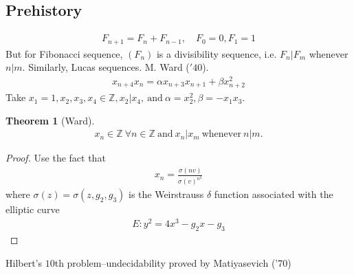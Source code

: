 \documentclass[12pt,reqno]{amsart}
\numberwithin{equation}{section}  %
\newcommand{\zz}{\mathbb{Z}}
\newtheorem{theorem}{Theorem}[section]
\begin{document}
  \subsection{Prehistory} 
  \label{ssec:prehistory}
%
%
  \begin{equation*}
    \begin{split}
      F_{n+1} = F_{n} + F_{n-1}, \quad F_{0}=0, F_{1}=1
    \end{split}
  \end{equation*}
%
%
  But for Fibonacci sequence, $(F_{n})$ is a divisibility sequence, i.e.
  $F_{n} \vert F_{m}$ whenever $n \vert m$. Similarly, Lucas sequences.
  M. Ward ($'40$).
%
%
  \begin{equation*}
    \begin{split}
      x_{n+4} x_{n} = \alpha x_{n+3}x_{n+1} + \beta x_{n+2}^{2}
    \end{split}
  \end{equation*}
%
%
  Take $x_{1} =1, x_{2},x_{3}, x_{4} \in \zz, x_{2} \vert x_{4}, \ \text{and} \
  \alpha = x_{2}^{2}, \beta = -x_{1} x_{3}$. 
%
%
%
%
%
%
%
%
  \begin{theorem}[Ward]
%
%
    \begin{equation*}
      \begin{split}
	x_{n} \in \zz \ \forall n \in \zz \ \text{and} \ x_{n} \vert x_{m} \
	\text{whenever} \ n \vert m.
      \end{split}
    \end{equation*}
%
%
%
%
%
%
    \label{thm:main}
  \end{theorem}
%
%
  \begin{proof}
    Use the fact that %
%
    \begin{equation*}
      \begin{split}
	x_{n} = \frac{\sigma(nv)}{\sigma(v)^{n^{2}}}
      \end{split}
    \end{equation*}
%
%
    where $\sigma(z) = \sigma(z, g_{2}, g_{3})$ is the Weirstrauss $\delta$ function
    associated with the elliptic curve
%
%
    \begin{equation*}
      \begin{split}
	E: y^{2}=4x^{3} - g_{2}x - g_{3}
      \end{split}
    \end{equation*}
%
%
  \end{proof}
  Hilbert's $10$th problem--undecidability proved by Matiyasevich ('70)
\end{document}
